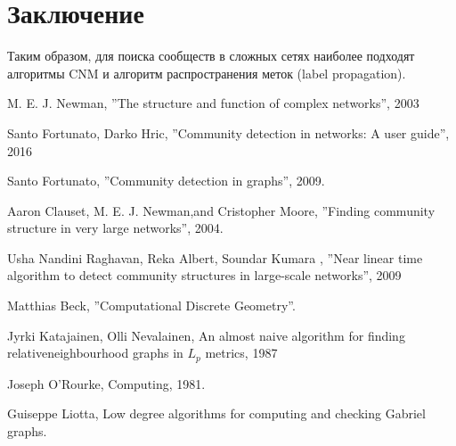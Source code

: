 \documentclass{article}
\begin{document}
\section*{Заключение}

Таким образом, для поиска сообществ в сложных сетях наиболее подходят алгоритмы CNM и алгоритм распространения меток (label propagation).

\begin{thebibliography}{9}

 M. E. J. Newman, ''The structure and function of complex networks'', 2003

 Santo Fortunato, Darko Hric, ''Community detection in networks:  A user guide'', 2016

 Santo Fortunato, ''Community detection in graphs'', 2009.

 Aaron Clauset, M. E. J. Newman,and Cristopher Moore, ''Finding community structure in very large networks'', 2004.

 Usha Nandini Raghavan, Reka Albert, Soundar Kumara , ''Near linear time algorithm to detect community structures in large-scale networks'', 2009

 Matthias Beck, ''Computational Discrete Geometry''.

 Jyrki Katajainen, Olli Nevalainen, An almost naive algorithm for finding relativeneighbourhood graphs in $L_p$ metrics, 1987

 Joseph O'Rourke, Computing, 1981.

 Guiseppe Liotta, Low degree algorithms for computing and checking Gabriel graphs.

\end{thebibliography} 
\end{document}
